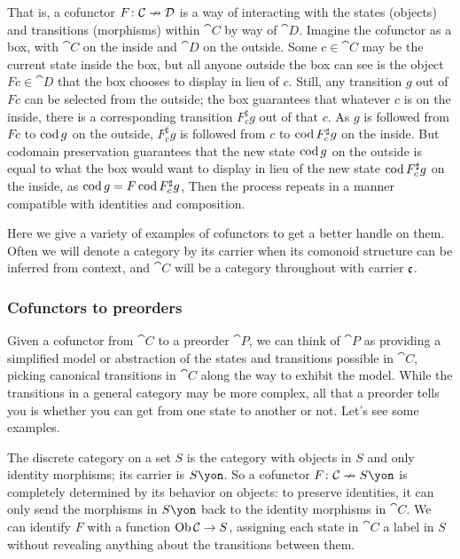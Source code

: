 \documentclass[Book-Poly]{subfiles}
\begin{document}
That is, a cofunctor $F\colon\mathcal{C}\nrightarrow\mathcal{D}$ is a way of interacting with the states (objects) and transitions (morphisms) within $\cat{C}$ by way of $\cat{D}$.
Imagine the cofunctor as a box, with $\cat{C}$ on the inside and $\cat{D}$ on the outside.
Some $c\in\cat{C}$ may be the current state inside the box, but all anyone outside the box can see is the object $Fc\in\cat{D}$ that the box chooses to display in lieu of $c$.
Still, any transition $g$ out of $Fc$ can be selected from the outside; the box guarantees that whatever $c$ is on the inside, there is a corresponding transition $F^\sharp_c g$ out of that $c$.
As $g$ is followed from $Fc$ to $\operatorname{cod} g$ on the outside, $F^\sharp_c g$ is followed from $c$ to $\operatorname{cod} F^\sharp_c g$ on the inside.
But codomain preservation guarantees that the new state $\operatorname{cod} g$ on the outside is equal to what the box would want to display in lieu of the new state $\operatorname{cod} F^\sharp_c g$ on the inside, as $\operatorname{cod} g=F\operatorname{cod} F^\sharp_c g$,
Then the process repeats in a manner compatible with identities and composition.

Here we give a variety of examples of cofunctors to get a better handle on them.
Often we will denote a category by its carrier when its comonoid structure can be inferred from context, and $\cat{C}$ will be a category throughout with carrier $\mathfrak{c}$.

\subsubsection{Cofunctors to preorders}

Given a cofunctor from $\cat{C}$ to a preorder $\cat{P}$, we can think of $\cat{P}$ as providing a simplified model or abstraction of the states and transitions possible in $\cat{C}$, picking canonical transitions in $\cat{C}$ along the way to exhibit the model.
While the transitions in a general category may be more complex, all that a preorder tells you is whether you can get from one state to another or not.
Let's see some examples.

\begin{example} \label{ex.cof_to_discrete}
The discrete category on a set $S$ is the category with objects in $S$ and only identity morphisms; its carrier is $S\yon$.
So a cofunctor $F\colon\cat C\cof S\yon$ is completely determined by its behavior on objects: to preserve identities, it can only send the morphisms in $S\yon$ back to the identity morphisms in $\cat C$.
We can identify $F$ with a function $\operatorname{Ob}\mathcal{C}\to S$, assigning each state in $\cat C$ a label in $S$ without revealing anything about the transitions between them.
\end{example}
\end{document}
